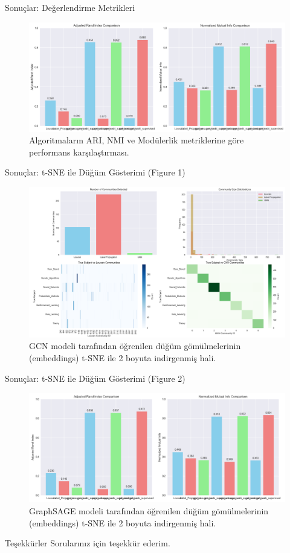 \documentclass{beamer}
\begin{document}
\begin{frame}{Sonuçlar: Değerlendirme Metrikleri}
    \begin{figure}
        \includegraphics[width=\textwidth]{../results/evaluation_metrics.png}
        \caption{Algoritmaların ARI, NMI ve Modülerlik metriklerine göre performans karşılaştırması.}
    \end{figure}
\end{frame}

\begin{frame}{Sonuçlar: t-SNE ile Düğüm Gösterimi (Figure 1)}
    \begin{figure}
        \includegraphics[width=\textwidth]{../results/Figure_1.png}
        \caption{GCN modeli tarafından öğrenilen düğüm gömülmelerinin (embeddings) t-SNE ile 2 boyuta indirgenmiş hali.}
    \end{figure}
\end{frame}

\begin{frame}{Sonuçlar: t-SNE ile Düğüm Gösterimi (Figure 2)}
    \begin{figure}
        \includegraphics[width=\textwidth]{../results/Figure_2.png}
        \caption{GraphSAGE modeli tarafından öğrenilen düğüm gömülmelerinin (embeddings) t-SNE ile 2 boyuta indirgenmiş hali.}
    \end{figure}
\end{frame}

\begin{frame}{Teşekkürler}
    \centering
    \Huge
    Sorularınız için teşekkür ederim.
\end{frame}
\end{document}
